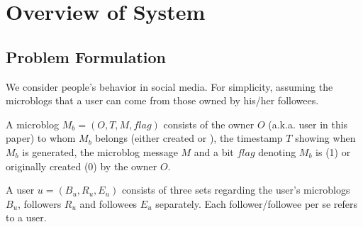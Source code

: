 \section{Overview of System \sys{}}
\label{sec:overv}


\subsection{Problem Formulation}

We consider people's \retg{} behavior in social media.
For simplicity, assuming the microblogs that a user can \ret{} come from those owned by his/her followees.


\begin{definition}
\label{def:blog}
A microblog $M_b = (O, T, M, flag)$ consists of the owner $O$ (a.k.a. user in this paper) to whom $M_b$ belongs (either created or \retd{}), the timestamp $T$ showing when $M_b$ is generated, the microblog message $M$ and a bit $flag$ denoting $M_b$ is \retd{} (1) or originally created (0) by the owner $O$.
\end{definition}

\begin{definition}
\label{def:user}
A user $u = (B_u, R_u, E_u)$ consists of three sets regarding the user's microblogs $B_u$, followers $R_u$ and followees $E_u$ separately.
Each follower/followee per se refers to a user.
\end{definition}

